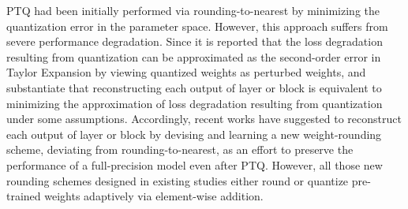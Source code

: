 \documentclass{article}
\theoremstyle{plain}
\theoremstyle{definition}
\theoremstyle{remark}
\begin{document}
PTQ had been initially performed via rounding-to-nearest by minimizing the quantization error in the parameter space. However, this approach suffers from severe performance degradation. 
Since it is reported that the loss degradation resulting from quantization can be approximated as the second-order error in Taylor Expansion by viewing quantized weights as perturbed weights, \citet{nagel2020adaround} and \citet{li2021brecq} substantiate that reconstructing each output of layer or block is equivalent to minimizing the approximation of loss degradation resulting from quantization under some assumptions. Accordingly, recent works \citep{nagel2020adaround, li2021brecq, hubara2021adaquant, wei2022qdrop} have suggested to reconstruct each output of layer or block by devising and learning a new weight-rounding scheme, deviating from rounding-to-nearest, as an effort to preserve the performance of a full-precision model even after PTQ.
However, all those new rounding schemes designed in existing studies either round or quantize pre-trained weights adaptively via element-wise addition.
\end{document}
